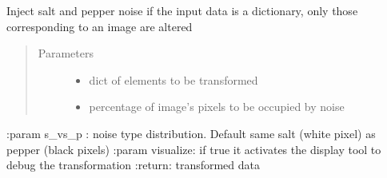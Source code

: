 \documentclass[letterpaper,10pt,english]{sphinxmanual}
\begin{document}
\begin{fulllineitems}
\label{\detokenize{ida_lib.operations:ida_lib.operations.transforms.inject_salt_and_pepper_noise}}
Inject salt and pepper noise if the input data is a dictionary, only those corresponding to an image are altered
\begin{quote}\begin{description}
\item[{Parameters}] \leavevmode\begin{itemize}
\item {} 
 \textendash{} dict of elements to be transformed

\item {} 
 \textendash{} percentage of image’s pixels to be occupied by noise

\end{itemize}

\end{description}\end{quote}

:param s\_vs\_p : noise type distribution. Default same salt (white pixel) as pepper (black pixels)
:param visualize: if true it activates the display tool to debug the transformation
:return: transformed data

\end{fulllineitems}

\end{document}

